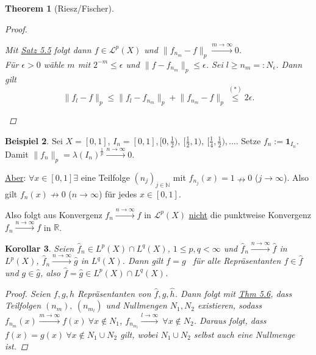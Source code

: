\documentclass[a4paper]{report}
\newcommand{\doubleOne}{\textbf{1}}
\newcommand{\R}{\mathbb{R}}
\newcommand{\N}{\mathbb{N}}
\newcommand{\toInf}{\rightarrow \infty}
\newcommand{\Leb}{\mathcal{L}}
\newcommand{\jlabel}[1]{\label{j_#1}}
\newcommand{\jhyperref}[2]{\hyperref[j_#1]{#2}}
\newcommand{\jlink}[1]{\jhyperref{#1}{#1}}
\newcommand{\fu}{\text{\textit{(f.ü.)}}}
\newcommand{\jspacesmall}{\vspace{4pt}}
\theoremstyle{plain}
\newtheorem{thm}{Theorem}[chapter]
\newtheorem{kor}[thm]{Korollar}
\theoremstyle{definition}
\newtheorem{expl}[thm]{Beispiel}
\begin{document}
{{{{\begin{thm}[Riesz/Fischer]
\begin{proof}
\begin{itemize}
                \jspacesmall
                
                Mit \jlink{Satz 5.5} folgt dann $f\in\Leb^p(X)$ und $\lVert f_{n_m} - f \rVert_p \xrightarrow{m\toInf} 0$.\\
                Für $\epsilon > 0$ wähle $m$ mit $2^{-m} \le \epsilon$ und $\lVert f - f_{n_m} \rVert_p \le \epsilon$. Sei $l\ge n_m =: N_\epsilon$. Dann gilt
                \[
                    \lVert f_l - f \rVert_p \le \lVert f_l - f_{n_m} \rVert_p + \lVert f_{n_m} - f \rVert_p \overset{(*)}{\le} 2\epsilon.
                \]
        \end{itemize}
    \end{proof}
\end{thm}

\begin{expl}
    \jlabel{Bsp 5.7}
    Sei $X=[0,1]$, $I_n = [0,1], [0,\frac{1}{2}),\ [\frac{1}{2},1),\ [\frac{1}{4}, \frac{1}{2}),\dots$. Setze $f_n := \doubleOne_{I_n}$. Damit $\lVert f_n \lVert_p = \lambda(I_n)^\frac{1}{p} \xrightarrow{n\toInf} 0$.
    
    \jspacesmall
    
    \uline{Aber}: $\forall x\in [0,1] \exists $ eine Teilfolge $(n_j)_{j\in\N}$ mit $f_{n_j}(x) = 1 \nrightarrow 0$ ($j\toInf$). Also  gilt $f_n(x) \nrightarrow 0$ ($n\toInf$) für jedes $x\in [0,1]$.
    
    \jspacesmall
    
    Also folgt aus Konvergenz $f_n \xrightarrow{n\toInf} f$ in $\Leb^p(X)$ \uline{nicht} die punktweise Konvergenz $f_n \xrightarrow{n\toInf} f$ in $\R$.
\end{expl}

\begin{kor}
    \jlabel{Kor 5.8}
    Seien $\hat{f}_n \in L^p(X) \cap L^q(X)$, $1\le p,q<\infty$ und $\hat{f}_n \xrightarrow{n\toInf} \hat{f}$ in $L^p(X)$, $\hat{f}_n \xrightarrow{n\toInf} \hat{g}$ in $L^q(X)$. Dann gilt $f=g$ \fu\ für alle Repräsentanten $f\in \hat{f}$ und $g\in\hat{g}$, also $\hat{f} = \hat{g} \in L^p(X) \cap L^q(X)$.
    
    \begin{proof}
        Seien $f,g,h$ Repräsentanten von $\hat{f}, \hat{g}, \hat{h}$. Dann folgt mit \jlink{Thm 5.6}, dass Teilfolgen $(n_m),\ (n_{m_l})$ und Nullmengen $N_1,N_2$ existieren, sodass\\
        $f_{n_m}(x) \xrightarrow{m\toInf} f(x)\ \forall x\notin N_1$, $f_{n_{m_l}} \xrightarrow{l\toInf}\ \forall x\notin N_2$. Daraus folgt, dass $f(x)=g(x)\ \forall x\notin N_1\cup N_2$ gilt, wobei $N_1\cup N_2$ selbst auch eine Nullmenge ist.
    \end{proof}
\end{kor}

}}}}
\end{document}

